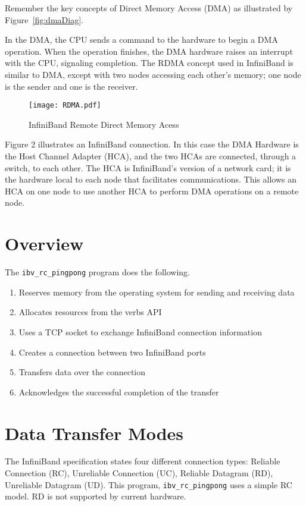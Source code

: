 \documentclass[letterpaper,12pt]{article}
\begin{document}
Remember the key concepts of Direct Memory Access (DMA) as illustrated
by Figure~\ref{fig:dmaDiag}.

In the DMA, the CPU sends a command to the hardware to begin a DMA
operation. When the operation finishes, the DMA hardware raises an
interrupt with the CPU, signaling completion. The RDMA concept used
in InfiniBand is similar to DMA, except with two nodes accessing each
other's memory; one node is the sender and one is the receiver.

\begin{figure}[tbp]
\centering
 \texttt{[image: RDMA.pdf]}
\caption{InfiniBand Remote Direct Memory Acess}
\label{fig:rdmaDiag}
\end{figure}

Figure 2 illustrates an InfiniBand connection. In this case the DMA
Hardware is the Host Channel Adapter (HCA), and the two HCAs are
connected, through a switch, to each other. The HCA is InfiniBand's
version of a network card; it is the hardware local to each node that
facilitates communications. This allows an HCA on one node to use another
HCA to perform DMA operations on a remote node.

\section{Overview}

The {\tt ibv\_rc\_pingpong} program does the following.

\begin{enumerate}
\item Reserves memory from the operating system for sending and receiving data
\item Allocates resources from the verbs API
\item Uses a TCP socket to exchange InfiniBand connection information
\item Creates a connection between two InfiniBand ports
\item Transfers data over the connection
\item Acknowledges the successful completion of the transfer
\end{enumerate}

\section{Data Transfer Modes} The InfiniBand specification states
four different connection types: Reliable Connection (RC), Unreliable
Connection (UC), Reliable Datagram (RD), Unreliable Datagram (UD).
This program, {\tt ibv\_rc\_pingpong} uses a simple RC model.  RD is not
supported by current hardware.
\end{document}

